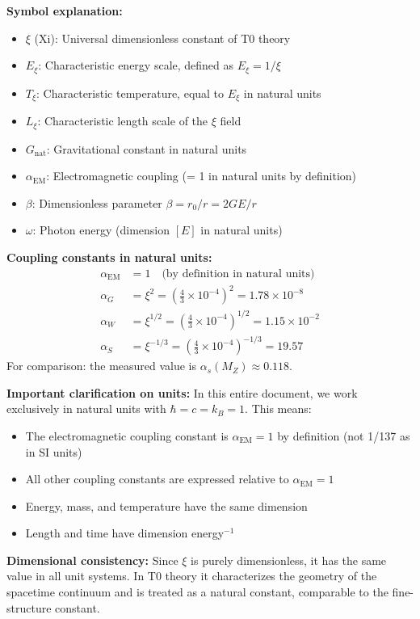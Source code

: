 	\textbf{Symbol explanation:}
	\begin{itemize}
		\item $\xi$ (Xi): Universal dimensionless constant of T0 theory
		\item $E_\xi$: Characteristic energy scale, defined as $E_\xi = 1/\xi$
		\item $T_\xi$: Characteristic temperature, equal to $E_\xi$ in natural units
		\item $L_\xi$: Characteristic length scale of the $\xi$ field
		\item $G_{\text{nat}}$: Gravitational constant in natural units
		\item $\alpha_{\text{EM}}$: Electromagnetic coupling (= 1 in natural units by definition)
		\item $\beta$: Dimensionless parameter $\beta = r_0/r = 2GE/r$
		\item $\omega$: Photon energy (dimension $[E]$ in natural units)
	\end{itemize}
	
	\textbf{Coupling constants in natural units:}
	\begin{align}
		\alpha_{\text{EM}} &= 1 \quad \text{(by definition in natural units)} \\
		\alpha_G &= \xi^2 = \left(\frac{4}{3} \times 10^{-4}\right)^2 = 1.78 \times 10^{-8} \\
		\alpha_W &= \xi^{1/2} = \left(\frac{4}{3} \times 10^{-4}\right)^{1/2} = 1.15 \times 10^{-2} \\
		\alpha_S &= \xi^{-1/3} = \left(\frac{4}{3} \times 10^{-4}\right)^{-1/3} = 19.57
	\end{align}
	For comparison: the measured value is $\alpha_s(M_Z) \approx 0.118$.
	
	\textbf{Important clarification on units:}
	In this entire document, we work exclusively in natural units with $\hbar = c = k_B = 1$. This means:
	\begin{itemize}
		\item The electromagnetic coupling constant is $\alpha_{\text{EM}} = 1$ by definition (not 1/137 as in SI units)
		\item All other coupling constants are expressed relative to $\alpha_{\text{EM}} = 1$
		\item Energy, mass, and temperature have the same dimension
		\item Length and time have dimension energy$^{-1}$
	\end{itemize}
	
	\textbf{Dimensional consistency:} Since $\xi$ is purely dimensionless, it has the same value in all unit systems. In T0 theory it characterizes the geometry of the spacetime continuum and is treated as a natural constant, comparable to the fine-structure constant.
	
